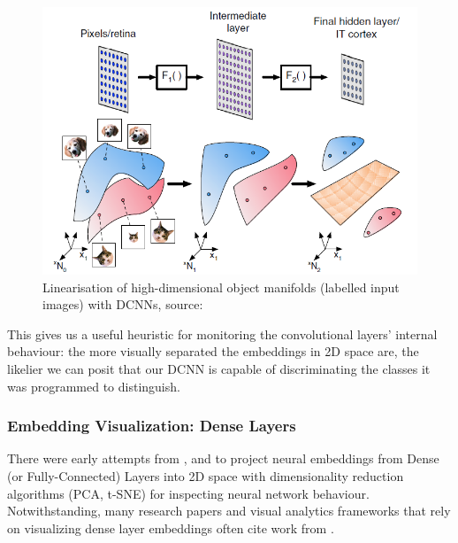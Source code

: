 \begin{figure}[H]
	\centering
	\includegraphics[scale=0.8]{images/embedding_view/HRV_Fig_004_Visual_Cortex.PNG}
	\caption{Linearisation of high-dimensional object manifolds (labelled input images) with DCNNs, source: \cite{Cohen2020SeparabilityAG}}
	\label{fig:HRV_004_Cortex_View}
\end{figure}

\vspace{0.2cm}

This gives us a useful heuristic for monitoring the convolutional layers' internal behaviour: the more visually separated the embeddings in 2D space are, the likelier we can posit that our DCNN is capable of discriminating the classes it was programmed to distinguish.

\subsubsection{Embedding Visualization: Dense Layers}

There were early attempts from \cite{Hinton2006}, \cite{Maaten2014AcceleratingTU} and \cite{aubry2015understanding} to project neural embeddings from Dense (or Fully-Connected) Layers into 2D space with dimensionality reduction algorithms (PCA, t-SNE) for inspecting neural network behaviour. Notwithstanding, many research papers and visual analytics frameworks that rely on visualizing dense layer embeddings often cite work from \cite{Rauber2017VisualizingTH}.

